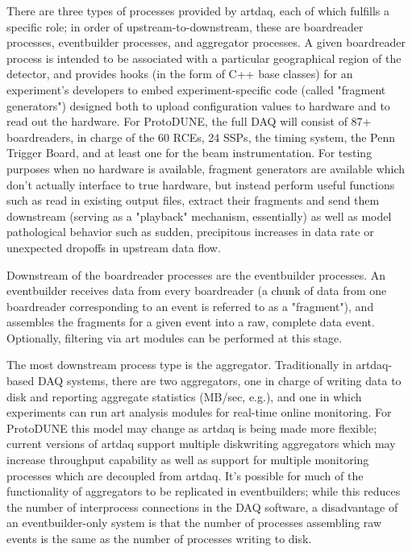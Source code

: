 There are three types of processes provided by artdaq, each of which
fulfills a specific role; in order of upstream-to-downstream, these
are boardreader processes, eventbuilder processes, and aggregator
processes. A given boardreader process is intended to be associated
with a particular geographical region of the detector, and provides
hooks (in the form of C++ base classes) for an experiment's developers
to embed experiment-specific code (called "fragment generators")
designed both to upload configuration values to hardware and to read
out the hardware. For ProtoDUNE, the full DAQ will consist of 87+ 
boardreaders, in charge of the 60 RCEs, 24 SSPs, the timing system, 
the Penn Trigger Board, and at least one for the beam instrumentation.
For testing purposes when
no hardware is available, fragment generators are available which
don't actually interface to true hardware, but instead perform useful
functions such as read in existing output files, extract their
fragments and send them downstream (serving as a "playback" mechanism,
essentially) as well as model pathological behavior such as sudden,
precipitous increases in data rate or unexpected dropoffs in upstream
data flow.

Downstream of the boardreader processes are the eventbuilder
processes. An eventbuilder receives data from every boardreader (a
chunk of data from one boardreader corresponding to an event is
referred to as a "fragment"), and assembles the fragments for a given
event into a raw, complete data event. Optionally, filtering via art
modules can be performed at this stage.

The most downstream process type is the aggregator. Traditionally in
artdaq-based DAQ systems, there are two aggregators, one in charge of
writing data to disk and reporting aggregate statistics (MB/sec,
e.g.), and one in which experiments can run art analysis modules for
real-time online monitoring. For ProtoDUNE this model may change as
artdaq is being made more flexible; current versions of artdaq support
multiple diskwriting aggregators which may increase throughput
capability as well as support for multiple monitoring processes which
are decoupled from artdaq. It's possible for much of the functionality
of aggregators to be replicated in eventbuilders; while this reduces
the number of interprocess connections in the DAQ software, a
disadvantage of an eventbuilder-only system is that the number of
processes assembling raw events is the same as the number of processes
writing to disk.

